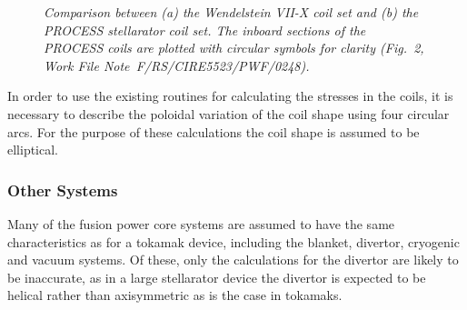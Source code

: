 \begin{figure}
\vspace*{180mm}
\caption[tosh]{\it Comparison between (a) the Wendelstein VII-X coil set and
(b) the PROCESS stellarator coil set. The inboard sections of the PROCESS
coils are plotted with circular symbols for clarity (Fig.~2, Work File
Note~F/RS/CIRE5523/PWF/0248).}
\label{fig:stell2}
\end{figure}

In order to use the existing routines for calculating the stresses in the
coils, it is necessary to describe the poloidal variation of the coil shape
using four circular arcs. For the purpose of these calculations the coil shape
is assumed to be elliptical.

\subsubsection{Other Systems}
Many of the fusion power core systems are assumed to have the same
characteristics as for a tokamak device, including the blanket, divertor,
cryogenic and vacuum systems. Of these, only the calculations for the divertor
are likely to be inaccurate, as in a large stellarator device the divertor is
expected to be helical rather than axisymmetric as is the case in tokamaks.

